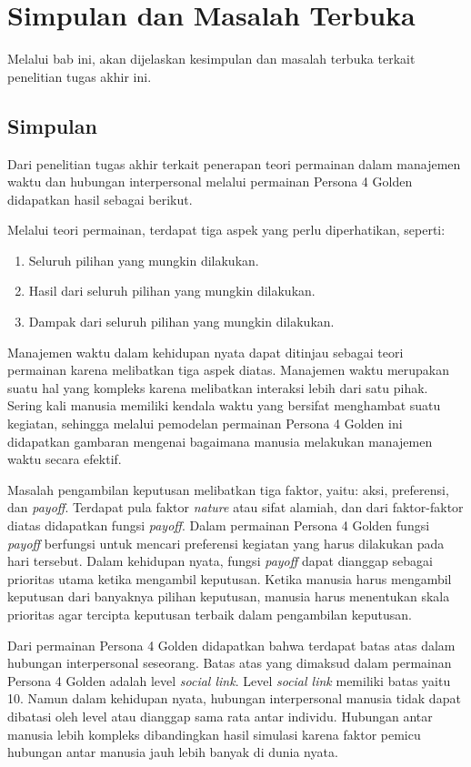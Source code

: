 \newtheorem{mater}{Masalah Terbuka}
\chapter{Simpulan dan Masalah Terbuka}
Melalui bab ini, akan dijelaskan kesimpulan dan masalah terbuka terkait penelitian tugas akhir ini.

\section{Simpulan}
Dari penelitian tugas akhir terkait penerapan teori permainan dalam manajemen waktu dan hubungan interpersonal melalui permainan Persona 4 Golden didapatkan hasil sebagai berikut.

Melalui teori permainan, terdapat tiga aspek yang perlu diperhatikan, seperti:
\begin{enumerate}
    \item Seluruh pilihan yang mungkin dilakukan.
    \item Hasil dari seluruh pilihan yang mungkin dilakukan.
    \item Dampak dari seluruh pilihan yang mungkin dilakukan.
\end{enumerate}
Manajemen waktu dalam kehidupan nyata dapat ditinjau sebagai teori permainan karena melibatkan tiga aspek diatas. Manajemen waktu merupakan suatu hal yang kompleks karena melibatkan interaksi lebih dari satu pihak. Sering kali manusia memiliki kendala waktu yang bersifat menghambat suatu kegiatan, sehingga melalui pemodelan permainan Persona 4 Golden ini didapatkan gambaran mengenai bagaimana manusia melakukan manajemen waktu secara efektif.

Masalah pengambilan keputusan melibatkan tiga faktor, yaitu: aksi, preferensi, dan \textit{payoff}. Terdapat pula faktor \textit{nature} atau sifat alamiah, dan dari faktor-faktor diatas didapatkan fungsi \textit{payoff}. Dalam permainan Persona 4 Golden fungsi \textit{payoff} berfungsi untuk mencari preferensi kegiatan yang harus dilakukan pada hari tersebut. Dalam kehidupan nyata, fungsi \textit{payoff} dapat dianggap sebagai prioritas utama ketika mengambil keputusan. Ketika manusia harus mengambil keputusan dari banyaknya pilihan keputusan, manusia harus menentukan skala prioritas agar tercipta keputusan terbaik dalam pengambilan keputusan.

Dari permainan Persona 4 Golden didapatkan bahwa terdapat batas atas dalam hubungan interpersonal seseorang. Batas atas yang dimaksud dalam permainan Persona 4 Golden adalah level \textit{social link}. Level \textit{social link} memiliki batas yaitu 10. Namun dalam kehidupan nyata, hubungan interpersonal manusia tidak dapat dibatasi oleh level atau dianggap sama rata antar individu. Hubungan antar manusia lebih kompleks dibandingkan hasil simulasi karena faktor pemicu hubungan antar manusia jauh lebih banyak di dunia nyata.

